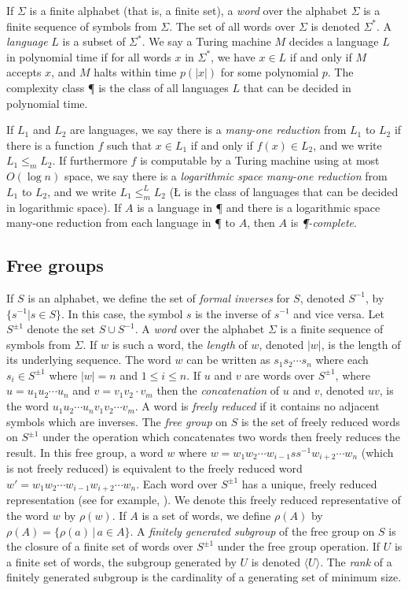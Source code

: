 \documentclass{article}
\newcommand{\gen}[1]{\langle #1 \rangle}
\newcommand{\Spm}{S^{\pm1}}
\begin{document}
If $\Sigma$ is a finite alphabet (that is, a finite set), a \emph{word} over the alphabet $\Sigma$ is a finite sequence of symbols from $\Sigma$.
The set of all words over $\Sigma$ is denoted $\Sigma^*$.
A \emph{language} $L$ is a subset of $\Sigma^*$.
We say a Turing machine $M$ decides a language $L$ in polynomial time if for all words $x$ in $\Sigma^*$, we have $x \in L$ if and only if $M$ accepts $x$, and $M$ halts within time $p(|x|)$ for some polynomial $p$.
The complexity class \P{} is the class of all languages $L$ that can be decided in polynomial time.

If $L_1$ and $L_2$ are languages, we say there is a \emph{many-one reduction} from $L_1$ to $L_2$ if there is a function $f$ such that $x \in L_1$ if and only if $f(x) \in L_2$, and we write $L_1 \leq_m L_2$.
If furthermore $f$ is computable by a Turing machine using at most $O(\log n)$ space, we say there is a \emph{logarithmic space many-one reduction} from $L_1$ to $L_2$, and we write $L_1 \leq_m^L L_2$ (\L{} is the class of languages that can be decided in logarithmic space).
If $A$ is a language in \P{} and there is a logarithmic space many-one reduction from each language in \P{} to $A$, then $A$ is \emph{\P-complete}.

\subsection{Free groups}

If $S$ is an alphabet, we define the set of \emph{formal inverses} for $S$, denoted $S^{-1}$, by $\{ s^{-1} | s \in S \}$.
In this case, the symbol $s$ is the inverse of $s^{-1}$ and vice versa.
Let $\Spm$ denote the set $S \cup S^{-1}$.
A \emph{word} over the alphabet $\Sigma$ is a finite sequence of symbols from $\Sigma$.
If $w$ is such a word, the \emph{length} of $w$, denoted $|w|$, is the length of its underlying sequence.
The word $w$ can be written as $s_1s_2\cdots s_n$ where each $s_i \in \Spm$ where $|w| = n$ and $1 \leq i \leq n$.
If $u$ and $v$ are words over $\Spm$, where $u = u_1 u_2\cdots u_n$ and $v = v_1 v_2 \cdot v_m$ then the \emph{concatenation} of $u$ and $v$, denoted $uv$, is the word $u_1 u_2 \cdots u_n v_1 v_2 \cdots v_m$.
A word is \emph{freely reduced} if it contains no adjacent symbols which are inverses.
The \emph{free group} on $S$ is the set of freely reduced words on $\Spm$ under the operation which concatenates two words then freely reduces the result.
In this free group, a word $w$ where $w = w_1 w_2 \cdots w_{i - 1} s s^{-1} w_{i + 2} \cdots w_n$ (which is not freely reduced) is equivalent to the freely reduced word $w' = w_1 w_2 \cdots w_{i - 1} w_{i + 2} \cdots w_n$.
Each word over $\Spm$ has a unique, freely reduced representation (see for example, \cite[Section~I.1]{ls77}).
We denote this freely reduced representative of the word $w$ by $\rho(w)$.
If $A$ is a set of words, we define $\rho(A)$ by $\rho(A) = \{ \rho(a) \, | \, a \in A\}$.
A \emph{finitely generated subgroup} of the free group on $S$ is the closure of a finite set of words over $\Spm$ under the free group operation.
If $U$ is a finite set of words, the subgroup generated by $U$ is denoted $\gen{U}$.
The \emph{rank} of a finitely generated subgroup is the cardinality of a generating set of minimum size.
\end{document}
